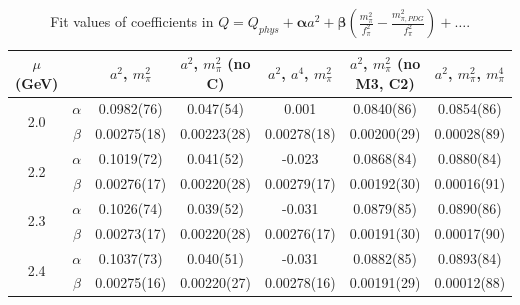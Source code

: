 \documentclass[12pt]{extarticle}
\begin{document}
\begin{table}[h!]
\begin{center}
\begin{tabular}{|c c|c|c|c|c|c|}
\hline
$\mu$ (GeV) &  & $a^2$, $m_\pi^2$& $a^2$, $m_\pi^2$ (no C)& $a^2$, $a^4$, $m_\pi^2$& $a^2$, $m_\pi^2$ (no M3, C2)& $a^2$, $m_\pi^2$, $m_\pi^4$\\
\hline
\multirow{2}{0.5in}{2.0} & $\alpha$ & 0.0982(76)& 0.047(54)& 0.001& 0.0840(86)& 0.0854(86)\\
 & $\beta$ & 0.00275(18)& 0.00223(28)& 0.00278(18)& 0.00200(29)& 0.00028(89)\\
\hline
\multirow{2}{0.5in}{2.2} & $\alpha$ & 0.1019(72)& 0.041(52)& -0.023& 0.0868(84)& 0.0880(84)\\
 & $\beta$ & 0.00276(17)& 0.00220(28)& 0.00279(17)& 0.00192(30)& 0.00016(91)\\
\hline
\multirow{2}{0.5in}{2.3} & $\alpha$ & 0.1026(74)& 0.039(52)& -0.031& 0.0879(85)& 0.0890(86)\\
 & $\beta$ & 0.00273(17)& 0.00220(28)& 0.00276(17)& 0.00191(30)& 0.00017(90)\\
\hline
\multirow{2}{0.5in}{2.4} & $\alpha$ & 0.1037(73)& 0.040(51)& -0.031& 0.0882(85)& 0.0893(84)\\
 & $\beta$ & 0.00275(16)& 0.00220(27)& 0.00278(16)& 0.00191(29)& 0.00012(88)\\
\hline
\end{tabular}
\caption{Fit values of coefficients in $Q = Q_{phys} + \mathbf{\alpha} a^2 + \mathbf{\beta}\left(\frac{m_\pi^2}{f_\pi^2}-\frac{m_{\pi,PDG}^2}{f_\pi^2}\right) + \ldots$.}
\end{center}
\end{table}




















\clearpage
\end{document}
